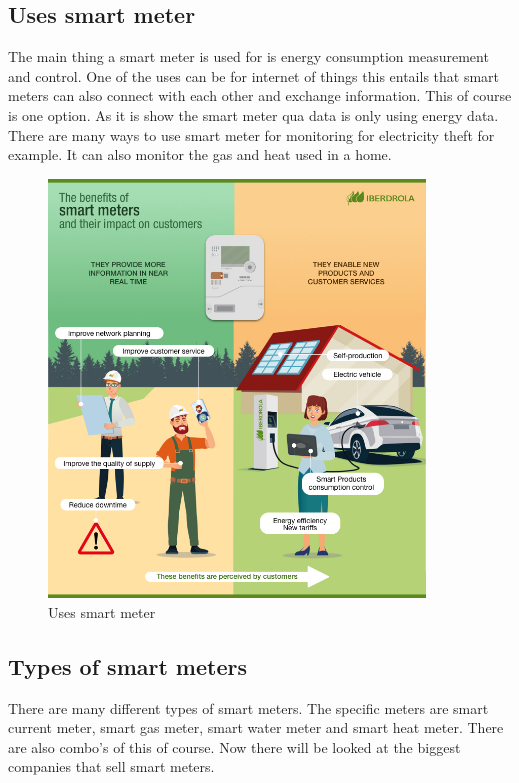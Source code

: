 \subsection{Uses smart meter}
The main thing a smart meter is used for is energy consumption measurement and control. One of the uses can be for internet of things\cite{SmartMeterIOT} this entails that smart meters can also connect with each other and exchange information. This of course is one option. As it is show the smart meter qua data is only using energy data. There are many ways to use smart meter for monitoring for electricity theft\cite{SmartMeterTheft} for example. It can also monitor the gas and heat used in a home.
\begin{figure}[H]
    \centering
    \includegraphics[width=10cm]{Images/Research/Infographic_Smart_Meters_EN.jpg}
    \caption{Uses smart meter\cite{FigureSM}}
    \label{fig:uses_smart_meter}
\end{figure}

\subsection{Types of smart meters}
There are many different types of smart meters. The specific meters are smart current meter, smart gas meter, smart water meter and smart heat meter\cite{DiffSMeters}. There are also combo's of this of course. Now there will be looked at the biggest companies that sell smart meters.

